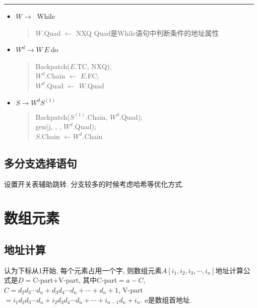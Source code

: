             \hrule

            \begin{itemize}
                \item $W\to\ $ While
                    \begin{verse}
                        $W$.Quad $\gets$ NXQ \hfill Quad是While语句中判断条件的地址属性
                    \end{verse}
                \item $W^d\to W\ E\ $do
                    \begin{verse}
                        Backpatch($E$.TC, NXQ); \\
                        $W^d$.Chain $\gets$ $E$.FC; \\
                        $W^d$.Quad $\gets$ $W$.Quad
                    \end{verse}
                \item $S\to W^dS^{(1)}$
                    \begin{verse}
                        Backpatch($S^{(1)}$.Chain, $W^d$.Quad); \\
                        gen(j, \uline\quad, \uline\quad, $W^d$.Quad); \\
                        $S$.Chain $\gets W^d$.Chain
                    \end{verse}
            \end{itemize}


        \subsection{多分支选择语句}

            设置开关表辅助跳转. 分支较多的时候考虑哈希等优化方式.

    \section{数组元素}

        \subsection{地址计算}

            认为下标从1开始, 每个元素占用一个字, 则数组元素$A[i_1, i_2, i_3, \cdots, i_n]$地址计算公式是$D=$C-part$+$V-part, 其中C-part$=a-C$, $C=d_2d_3\cdots d_n+d_3d_4\cdots d_n+\cdots+d_n+1$, V-part$=i_1d_2d_3\cdots d_n+i_2d_3d_4\cdots d_n+\cdots+i_{n-1}d_n+i_n$. $a$是数组首地址.

